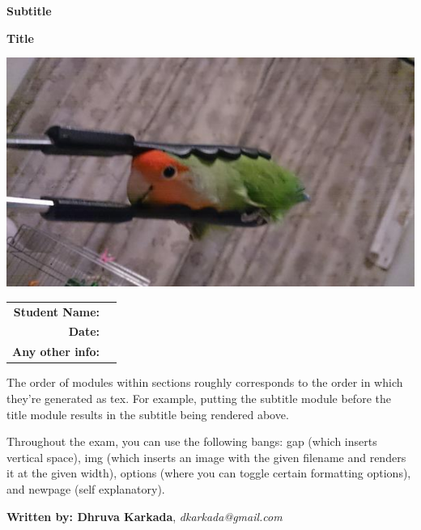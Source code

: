 \documentclass{exam}
\begin{document}
\begin{coverpages}
	\begin{center}
		\vspace{0.05 in}
		\par\noindent\textbf{\large  Subtitle}
		\vspace{0.05 in}
		\vspace{0.10 in}
		\par\noindent\textbf{\Huge   Title}
		\vspace{0.5 in}
		\vspace{0.05 in}
		\par\noindent
				\includegraphics[width=.7\textwidth]{images/tong.jpg}
		\vspace{0.05 in}
		\vspace{0.5 in}
		\vspace{0.10 in}
		\vspace{0.15 in}
		\par
		\def\arraystretch{2}\tabcolsep=3pt
		\begin{tabular}{r r}
			\textbf{Student Name:} & \makebox[4in]{\hrulefill} \\
			\textbf{Date:} & \makebox[4in]{\hrulefill} \\
			\textbf{Any other info:} & \makebox[4in]{\hrulefill} \\
		\end{tabular}
		\vspace{0.15 in}
	\end{center}
		\vspace{0.15 in}
	\par The order of modules within sections roughly corresponds to the order in which they're generated as tex. For example, putting the subtitle module before the title module results in the subtitle being rendered above.
	\par Throughout the exam, you can use the following bangs: gap (which inserts vertical space), img (which inserts an image with the given filename and renders it at the given width), options (where you can toggle certain formatting options), and newpage (self explanatory).
		\vspace{0.15 in}
	\begin{center}
		\vspace{0.05 in}
		\par\noindent\textbf{Written by:  Dhruva Karkada}, \textit{ dkarkada@gmail.com}
		\vspace{0.05 in}
	\end{center}
\end{coverpages}
\end{document}
